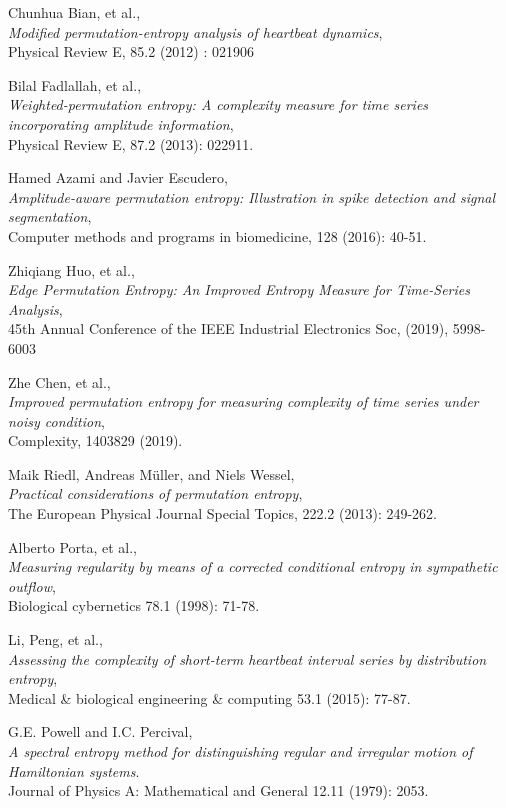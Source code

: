 \documentclass[12pt, a4paper, titlepage, openany]{book}
\begin{document}
\begin{thebibliography}{9}
Chunhua Bian, et al.,\\
\emph{Modified permutation-entropy analysis of heartbeat dynamics},\\
Physical Review E,  85.2 (2012) : 021906
 
Bilal Fadlallah, et al.,\\
\emph{Weighted-permutation entropy: A complexity measure for time series incorporating amplitude information},\\
Physical Review E, 87.2 (2013): 022911.
 
Hamed Azami and Javier Escudero,\\
\emph{Amplitude-aware permutation entropy: Illustration in spike detection and signal segmentation},\\
Computer methods and programs in biomedicine, 128 (2016): 40-51.
 
Zhiqiang Huo, et al.,\\
\emph{Edge Permutation Entropy: An Improved Entropy Measure for Time-Series Analysis},\\
45th Annual Conference of the IEEE Industrial Electronics Soc, (2019), 5998-6003
 
Zhe Chen, et al., \\
\emph{Improved permutation entropy for measuring complexity of time series under noisy condition},\\
Complexity, 1403829 (2019).
 
Maik Riedl, Andreas Müller, and Niels Wessel,\\
\emph{Practical considerations of permutation entropy},\\
The European Physical Journal Special Topics, 222.2 (2013): 249-262.

Alberto Porta, et al.,\\
\emph{Measuring regularity by means of a corrected conditional entropy in sympathetic outflow},\\
Biological cybernetics 78.1 (1998): 71-78.

Li, Peng, et al.,\\
\emph{Assessing the complexity of short-term heartbeat interval series by distribution entropy},\\
Medical \& biological engineering \& computing 53.1 (2015): 77-87. 

 G.E. Powell and I.C. Percival,\\
\emph{A spectral entropy method for distinguishing regular and irregular motion of Hamiltonian systems}.\\
Journal of Physics A: Mathematical and General 12.11 (1979): 2053.
 

\end{thebibliography}
\end{document}
